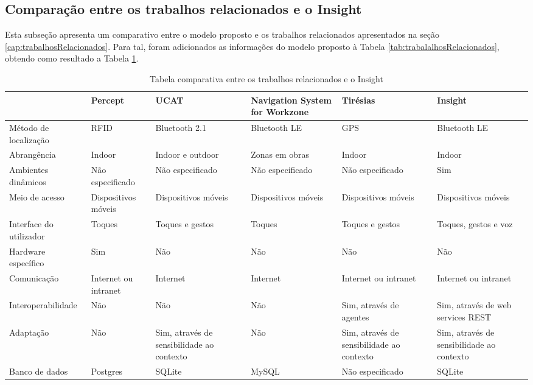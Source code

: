 \documentclass[twoside,english,brazilian]{UNISINOSartigo}
\begin{document}
\FloatBarrier
\subsection{Comparação entre os trabalhos relacionados e o Insight}
Esta subseção apresenta um comparativo entre o modelo proposto e os trabalhos relacionados apresentados na seção \ref{cap:trabalhosRelacionados}. Para tal, foram adicionados as informações do modelo proposto à Tabela \ref{tab:trabalalhosRelacionados}, obtendo como resultado a Tabela \ref{tab:trabalalhosRelacionadosEInsight}.

\begin{table}
	\caption{Tabela comparativa entre os trabalhos relacionados e o Insight}
	\label{tab:trabalalhosRelacionadosEInsight}
	\centering%
	\begin{minipage}{0.9\textwidth}
	\begin{adjustbox}{max width=\textwidth}
		\begin{tabular}{ p{3cm} | p{3cm} | p{3cm} | p{3cm} | p{3cm} | p{3cm} }
\hline
	 & \textbf{Percept} & \textbf{UCAT} & \textbf{Navigation System for Workzone} & \textbf{Tirésias} & \textbf{Insight} \\ \hline
	Método de localização & RFID & Bluetooth 2.1 & Bluetooth LE & GPS & Bluetooth LE \\ \hline
	Abrangência & Indoor & Indoor e outdoor & Zonas em obras & Indoor & Indoor \\ \hline
	Ambientes dinâmicos & Não especificado & Não especificado & Não especificado & Não especificado & Sim \\ \hline
	Meio de acesso & Dispositivos móveis & Dispositivos móveis & Dispositivos móveis & Dispositivos móveis & Dispositivos móveis \\ \hline
	Interface do utilizador & Toques & Toques e gestos & Toques & Toques e gestos & Toques, gestos e voz \\ \hline
	Hardware específico & Sim & Não & Não & Não & Não \\ \hline
	Comunicação & Internet ou intranet & Internet & Internet & Internet ou intranet & Internet ou intranet \\ \hline
	Interoperabilidade & Não & Não & Não & Sim, através de agentes & Sim, através de web services REST \\ \hline
	Adaptação & Não & Sim, através de sensibilidade ao contexto & Não & Sim, através de sensibilidade ao contexto & Sim, através de sensibilidade ao contexto \\ \hline
	Banco de dados & Postgres & SQLite & MySQL & Não especificado & SQLite \\ \hline

\end{tabular}
\end{adjustbox}
\end{minipage}
\end{table}
\end{document}

